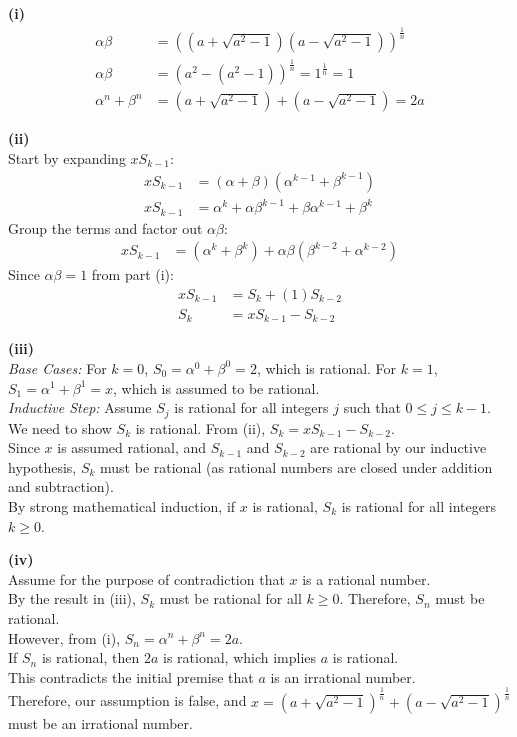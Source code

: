 \begin{solution}[Brief]
\textbf{(i)}
\begin{align*}
\alpha\beta &= \left( (a + \sqrt{a^2 - 1})(a - \sqrt{a^2 - 1}) \right)^{\frac{1}{n}} \\
\alpha\beta &= \left( a^2 - (a^2 - 1) \right)^{\frac{1}{n}} = 1^{\frac{1}{n}} = 1 \\
\alpha^n + \beta^n &= (a + \sqrt{a^2 - 1}) + (a - \sqrt{a^2 - 1}) = 2a
\end{align*}

\textbf{(ii)} \\
Start by expanding $xS_{k-1}$:
\begin{align*}
xS_{k-1} &= (\alpha + \beta)(\alpha^{k-1} + \beta^{k-1}) \\
xS_{k-1} &= \alpha^k + \alpha\beta^{k-1} + \beta\alpha^{k-1} + \beta^k
\end{align*}
Group the terms and factor out $\alpha\beta$:
\begin{align*}
xS_{k-1} &= (\alpha^k + \beta^k) + \alpha\beta(\beta^{k-2} + \alpha^{k-2})
\end{align*}
Since $\alpha\beta = 1$ from part (i):
\begin{align*}
xS_{k-1} &= S_k + (1)S_{k-2} \\
S_k &= xS_{k-1} - S_{k-2}
\end{align*}

\textbf{(iii)} \\
\textit{Base Cases:} For $k=0$, $S_0 = \alpha^0 + \beta^0 = 2$, which is rational. For $k=1$, $S_1 = \alpha^1 + \beta^1 = x$, which is assumed to be rational. \\
\textit{Inductive Step:} Assume $S_j$ is rational for all integers $j$ such that $0 \le j \le k-1$. \\
We need to show $S_k$ is rational. From (ii), $S_k = xS_{k-1} - S_{k-2}$. \\
Since $x$ is assumed rational, and $S_{k-1}$ and $S_{k-2}$ are rational by our inductive hypothesis, $S_k$ must be rational (as rational numbers are closed under addition and subtraction). \\
By strong mathematical induction, if $x$ is rational, $S_k$ is rational for all integers $k \ge 0$.

\textbf{(iv)} \\
Assume for the purpose of contradiction that $x$ is a rational number. \\
By the result in (iii), $S_k$ must be rational for all $k \ge 0$. Therefore, $S_n$ must be rational. \\
However, from (i), $S_n = \alpha^n + \beta^n = 2a$. \\
If $S_n$ is rational, then $2a$ is rational, which implies $a$ is rational. \\
This contradicts the initial premise that $a$ is an irrational number. \\
Therefore, our assumption is false, and $x = (a + \sqrt{a^2 - 1})^{\frac{1}{n}} + (a - \sqrt{a^2 - 1})^{\frac{1}{n}}$ must be an irrational number.
\end{solution}


